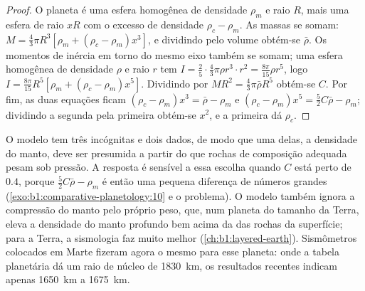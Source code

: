 \begin{proof}
O planeta é uma esfera homogênea de densidade $\rho_m$ e raio $R$, mais uma esfera de raio $xR$ com o excesso de densidade $\rho_c - \rho_m$. As massas se somam: $M = \tfrac43\pi R^3[\rho_m + (\rho_c - \rho_m)x^3]$, e dividindo pelo volume obtém-se $\bar\rho$. Os momentos de inércia em torno do mesmo eixo também se somam; uma esfera homogênea de densidade $\rho$ e raio $r$ tem
$I = \tfrac25\cdot\tfrac43\pi\rho r^3\cdot r^2 = \tfrac{8\pi}{15}\rho r^5$,
logo $I = \tfrac{8\pi}{15}R^5[\rho_m + (\rho_c - \rho_m)x^5]$. Dividindo por $MR^2 = \tfrac43\pi\bar\rho R^5$ obtém-se $C$. Por fim, as duas equações ficam $(\rho_c - \rho_m)x^3 = \bar\rho - \rho_m$ e $(\rho_c - \rho_m)x^5 =
\tfrac52C\bar\rho - \rho_m$; dividindo a segunda pela primeira obtém-se $x^2$, e a primeira dá $\rho_c$.
\end{proof}

O modelo tem três incógnitas e dois dados, de modo que uma delas, a densidade do manto, deve ser presumida a partir do que rochas de composição adequada pesam sob pressão. A resposta é sensível a essa escolha quando $C$ está perto de $0.4$, porque $\tfrac52C\bar\rho - \rho_m$ é então uma pequena diferença de números grandes (\cref{exo:b1:comparative-planetology:10} e o problema). O modelo também ignora a compressão do manto pelo próprio peso, que, num planeta do tamanho da Terra, eleva a densidade do manto profundo bem acima da das rochas da superfície; para a Terra, a sismologia faz muito melhor (\cref{ch:b1:layered-earth}). Sismômetros colocados em Marte fizeram agora o mesmo para esse planeta: onde a tabela planetária dá um raio de núcleo de \qty{1830}{km}, os resultados recentes indicam apenas \qty{1650}{km} a \qty{1675}{km}.

